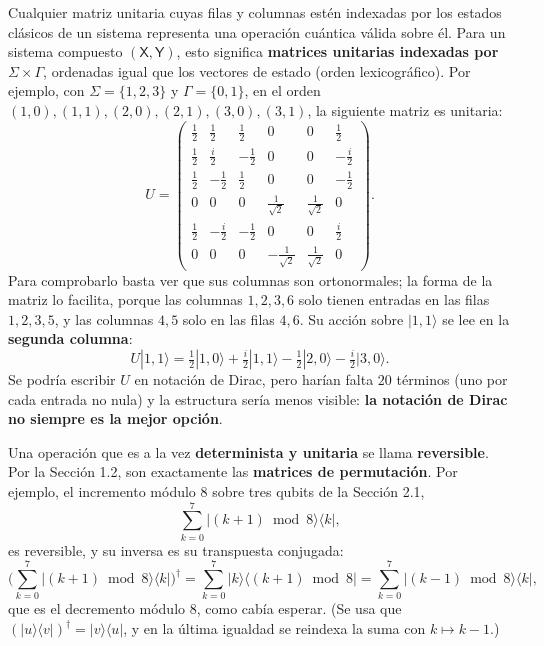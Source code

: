 \documentclass[11pt, a4paper, twoside, openright]{report}
\begin{document}
\noindent Cualquier matriz unitaria cuyas filas y columnas estén indexadas por los estados clásicos de un sistema representa una operación cuántica válida sobre él. Para un sistema compuesto $(\mathsf{X},\mathsf{Y})$, esto significa \textbf{matrices unitarias indexadas por $\Sigma\times\Gamma$}, ordenadas igual que los vectores de estado (orden lexicográfico). Por ejemplo, con $\Sigma = \{1,2,3\}$ y $\Gamma = \{0,1\}$, en el orden $(1,0),(1,1),(2,0),(2,1),(3,0),(3,1)$, la siguiente matriz es unitaria:
\[
U = \begin{pmatrix}
\frac12 & \frac12 & \frac12 & 0 & 0 & \frac12 \\
\frac12 & \frac{i}{2} & -\frac12 & 0 & 0 & -\frac{i}{2} \\
\frac12 & -\frac12 & \frac12 & 0 & 0 & -\frac12 \\
0 & 0 & 0 & \frac{1}{\sqrt2} & \frac{1}{\sqrt2} & 0 \\
\frac12 & -\frac{i}{2} & -\frac12 & 0 & 0 & \frac{i}{2} \\
0 & 0 & 0 & -\frac{1}{\sqrt2} & \frac{1}{\sqrt2} & 0
\end{pmatrix}.
\]
Para comprobarlo basta ver que sus columnas son ortonormales; la forma de la matriz lo facilita, porque las columnas $1,2,3,6$ solo tienen entradas en las filas $1,2,3,5$, y las columnas $4,5$ solo en las filas $4,6$. Su acción sobre $|1,1\rangle$ se lee en la \textbf{segunda columna}:
\[ U|1,1\rangle = \tfrac12|1,0\rangle + \tfrac{i}{2}|1,1\rangle - \tfrac12|2,0\rangle - \tfrac{i}{2}|3,0\rangle. \]
Se podría escribir $U$ en notación de Dirac, pero harían falta $20$ términos (uno por cada entrada no nula) y la estructura sería menos visible: \textbf{la notación de Dirac no siempre es la mejor opción}.

\begin{tcolorbox}[colback=teal!5!white,colframe=teal!75!black,title=\textbf{Operaciones reversibles}]
Una operación que es a la vez \textbf{determinista y unitaria} se llama \textbf{reversible}. Por la Sección 1.2, son exactamente las \textbf{matrices de permutación}. Por ejemplo, el incremento módulo $8$ sobre tres qubits de la Sección 2.1,
\[ \sum_{k=0}^7|(k+1)\bmod 8\rangle\langle k|, \]
es reversible, y su inversa es su transpuesta conjugada:
\[ \Big(\sum_{k=0}^7|(k+1)\bmod8\rangle\langle k|\Big)^\dagger = \sum_{k=0}^7|k\rangle\langle(k+1)\bmod8| = \sum_{k=0}^7|(k-1)\bmod8\rangle\langle k|, \]
que es el decremento módulo $8$, como cabía esperar. (Se usa que $(|u\rangle\langle v|)^\dagger = |v\rangle\langle u|$, y en la última igualdad se reindexa la suma con $k \mapsto k-1$.)
\end{tcolorbox}
\end{document}
